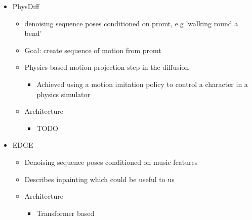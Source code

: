 \begin{itemize}
    \item PhysDiff \cite{PhysDiff}
    \begin{itemize}
        \item denoising sequence poses conditioned on promt, e.g 'walking round a bend'
        \item Goal: create sequence of motion from promt
        \item Physics-based motion projection step in the diffusion
        \begin{itemize}
            \item Achieved using a motion imitation policy to control a character in a
            physics simulator
        \end{itemize}
        \item Architecture
        \begin{itemize}
            \item TODO
        \end{itemize}
    \end{itemize}

    \item EDGE \cite{EDGE}
    \begin{itemize}
        \item Denoising sequence poses conditioned on music features
        \item Describes inpainting which could be useful to us
        \item Architecture
        \begin{itemize}
            \item Transformer based
        \end{itemize}
    \end{itemize}


\end{itemize}
